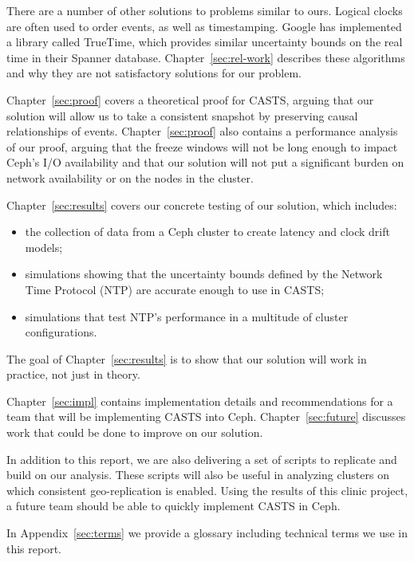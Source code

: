 There are a number of other solutions to problems similar to
ours. Logical clocks are often used to order events, as well as
timestamping. Google has implemented a library called TrueTime, which
provides similar uncertainty bounds on the real time in their Spanner
database. Chapter~\ref{sec:rel-work} describes these algorithms and
why they are not satisfactory solutions for our problem.

Chapter~\ref{sec:proof} covers a theoretical proof for CASTS,
arguing that our solution will allow us to take a consistent snapshot
by preserving causal relationships of events. Chapter~\ref{sec:proof} also
contains a performance analysis of our proof, arguing that the freeze
windows will not be long enough to impact Ceph's I/O availability and that our
solution will not put a significant burden on network availability or
on the nodes in the cluster.

Chapter~\ref{sec:results} covers our concrete testing of our solution,
which includes:

\begin{itemize}
\item the collection of data from a Ceph cluster to create
  latency and clock drift models;
\item simulations showing that the uncertainty bounds defined by the
  Network Time Protocol (NTP) are accurate enough to use in CASTS;
\item simulations that test NTP's performance in a multitude of
  cluster configurations.
\end{itemize}
The goal of Chapter~\ref{sec:results} is to show that our solution will work
in practice, not just in theory.

Chapter~\ref{sec:impl} contains implementation details and
recommendations for a team that will be implementing CASTS
into Ceph. Chapter~\ref{sec:future} discusses work that could be done
to improve on our solution.

In addition to this report, we are also delivering a set of scripts to
replicate and build on our analysis. These scripts will also be useful
in analyzing clusters on which consistent geo-replication is
enabled. Using the results of this clinic project, a future team
should be able to quickly implement CASTS in Ceph.

In Appendix~\ref{sec:terms} we provide
a glossary including technical terms we use in this report.
